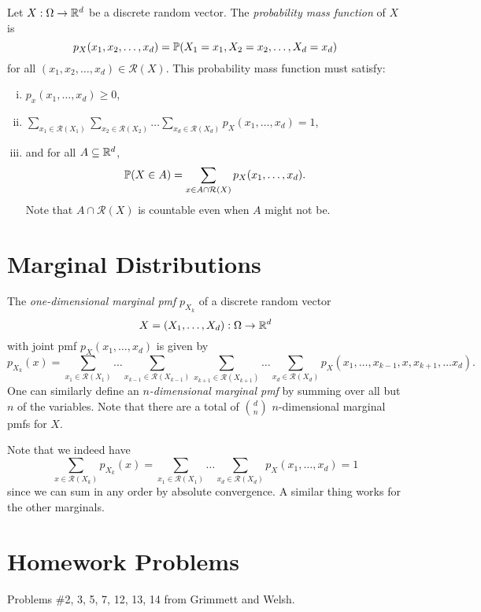 \begin{definition}
  Let $X : \Omega \to \mathbb{R}^d$ be a discrete random
  vector. The \emph{probability mass function} of $X$
  is
  \[
    p_X(x_1, x_2, \dots, x_d) = \mathbb{P}(X_1 = x_1, X_2 = x_2, \dots, X_d = x_d)
  \]
  for all $(x_1, x_2, \dots, x_d) \in \mathcal{R}(X)$.
  This probability mass function must satisfy:
  \begin{enumerate}[(i)]
    \item $p_x(x_1, \dots, x_d) \ge 0$,
    \item $\displaystyle \sum_{x_1 \in \mathcal{R}(X_1)} \sum_{x_2 \in \mathcal{R}(X_2)} \dots \sum_{x_d \in \mathcal{R}(X_d)} p_X(x_1, \dots, x_d) = 1$,
    \item and for all $A \subseteq \mathbb{R}^d$,
      \[
        \mathbb{P}(X \in A)
        = \sum_{x \in A \cap \mathcal{R}(X)}
        p_X(x_1, \dots, x_d).
      \]
      Note that $A \cap \mathcal{R}(X)$ is countable
      even when $A$ might not be.
  \end{enumerate}
\end{definition}

\section{Marginal Distributions}
\begin{definition}
  The \emph{one-dimensional marginal pmf}
  $p_{X_k}$
  of a discrete random vector
  \[X = (X_1, \dots, X_d) : \Omega \to \mathbb{R}^d\]
  with joint pmf $p_X(x_1, \dots, x_d)$
  is given by
  \[
    p_{X_k}(x) = \sum_{x_1 \in \mathcal{R}(X_1)} \dots \sum_{x_{k-1} \in \mathcal{R}(X_{k-1})} \sum_{x_{k+1} \in \mathcal{R}(X_{k+1})} \dots \sum_{x_d \in \mathcal{R}(X_d)} p_X(x_1, \dots, x_{k - 1}, x, x_{k + 1}, \dots x_d).
  \]
  One can similarly define an \emph{$n$-dimensional marginal pmf}
  by summing over all but $n$ of the variables.
  Note that there are a total of $\binom{d}{n}$
  $n$-dimensional marginal pmfs for $X$.
\end{definition}

\begin{remark}
  Note that we indeed have
  \[
    \sum_{x \in \mathcal{R}(X_k)} p_{X_k}(x)
    = \sum_{x_1 \in \mathcal{R}(X_1)} \dots \sum_{x_d \in \mathcal{R}(X_d)} p_X(x_1, \dots, x_d)
    = 1
  \]
  since we can sum in any order by absolute
  convergence. A similar thing works for
  the other marginals.
\end{remark}

\section{Homework Problems}
Problems \#2, 3, 5, 7, 12, 13, 14 from
Grimmett and Welsh.
